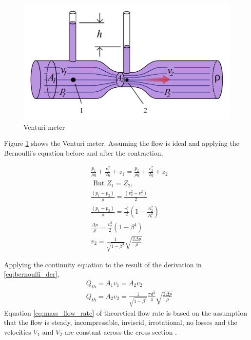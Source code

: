 \begin{figure}
    \centering
    \includegraphics[width=0.6\linewidth]{Figures/venturi.png}
    \caption{Venturi meter}
    \label{fig:venturi}
\end{figure}

Figure \ref{fig:venturi} shows the Venturi meter. Assuming the flow is ideal and applying the Bernoulli's equation before and after the contraction, 

\begin{equation}
\begin{aligned}
&\frac{p_{1}}{\rho g}+\frac{v_{1}^{2}}{2 g}+z_{1}=\frac{p_{2}}{\rho g}+\frac{v_{2}^{2}}{2 g}+z_{2} \\
&\text { But } Z_{1}=Z_{2}, \\
&\frac{\left(p_{1}-p_{2}\right)}{\rho}=\frac{\left(v_{2}^{2}-v_{1}^{2}\right)}{2} \\
&\frac{\left(p_{1}-p_{2}\right)}{\rho}=\frac{v_{2}^{2}}{2}\left(1-\frac{A_{2}^{2}}{A_{1}^{2}}\right) \\
&\frac{\Delta p}{\rho}=\frac{v_{2}^{2}}{2}\left(1-\beta^{4}\right) \\
&v_{2}=\frac{1}{\sqrt{1-\beta^{4}}} \sqrt{\frac{2 \Delta p}{\rho}}
\end{aligned}
\label{eq:bernoulli_der}
\end{equation}

Applying the continuity equation to the result of the derivation in \ref{eq:bernoulli_der},
\begin{equation}
\begin{aligned}
&Q_{t h}=A_{1} v_{1}=A_{2} v_{2} \\
&Q_{t h}=A_{2} v_{2}=\frac{1}{\sqrt{1-\beta^{4}}} \frac{\pi d^{2}}{4} \sqrt{\frac{2 \Delta p}{\rho}}
\end{aligned}
\label{eq:mass_flow_rate}
\end{equation}
Equation \ref{eq:mass_flow_rate} of theoretical flow rate is based on the assumption that the flow is steady, incompressible, inviscid, irrotational, no losses and the velocities $V_{1}$ and  $V_{2}$ are constant across the cross section \cite{arun2015prediction}. 

